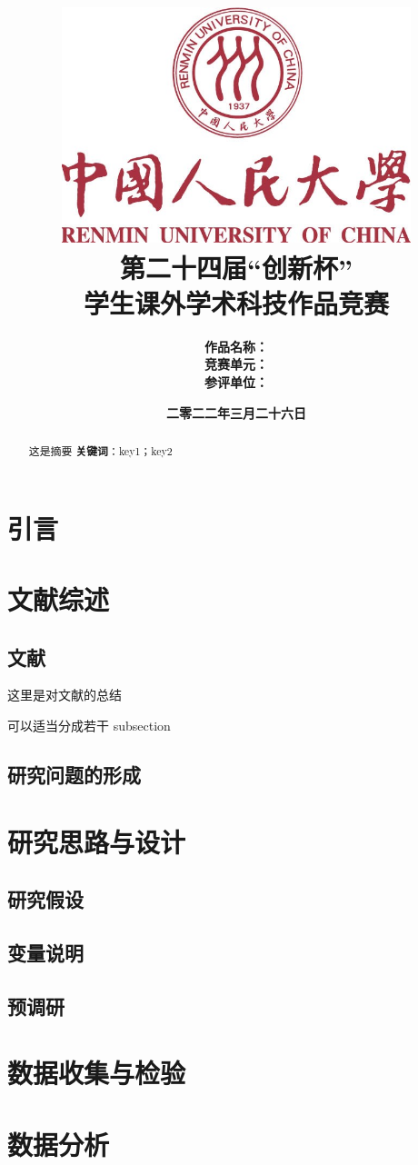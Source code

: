 \documentclass[zihao=5, UTF8]{ctexart}
\title{
\includegraphics[width=4in]{ruc} \\
\vspace*{0.1in}
\Huge{第二十四届“创新杯”  } \\
\Huge{学生课外学术科技作品竞赛}
\vspace*{1in}
}
\author{
	\vspace*{0.1in}
	\Large{\textbf{作品名称：\dlmu[13cm]{这里是标题}}} \\
	\vspace*{0.1in}
	\Large{\textbf{竞赛单元：\dlmu[13cm]{常规赛道}}} \\
	\Large{\textbf{参评单位：\dlmu[13cm]{统计学院}}} \\
	\vspace*{0.1in}
}\date{\Large{\textbf{二零二二年三月二十六日}}}
\begin{document}
\maketitle

\newpage
\renewcommand{\abstractname}{\Large 摘要\\}
\begin{abstract}
	\normalsize
	这是摘要
	\newline
	\newline
	\textbf{关键词}：key1；key2
\end{abstract}

\newpage
\tableofcontents

\newpage
\section{引言}

\section{文献综述}
\subsection{文献}
这里是对文献的总结

可以适当分成若干 subsection
\subsection{研究问题的形成}

\section{研究思路与设计}
\subsection{研究假设}
\subsection{变量说明}
\subsection{预调研}

\section{数据收集与检验}

\section{数据分析}
\end{document}
